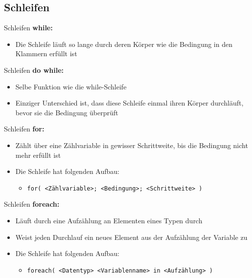 \subsection{Schleifen}
\begin{frame}{Schleifen}
	\textbf{while:} \\
	\begin{itemize}
		\item Die Schleife läuft so lange durch deren Körper wie die Bedingung in den Klammern erfüllt ist
	\end{itemize}
		
\end{frame}

\begin{frame}{Schleifen}
	\textbf{do while:} \\
	\begin{itemize}
		\item Selbe Funktion wie die while-Schleife
		\item Einziger Unterschied ist, dass diese Schleife einmal ihren Körper durchläuft, bevor sie die Bedingung überprüft
	\end{itemize}
		
\end{frame}

\begin{frame}{Schleifen}
	\textbf{for:} \\
	\begin{itemize}
		\item Zählt über eine Zählvariable in gewisser Schrittweite, bis die Bedingung nicht mehr erfüllt ist
		\item Die Schleife hat folgenden Aufbau:
		\begin{itemize}
			\item \alert{\texttt{for( <Zählvariable>; <Bedingung>; <Schrittweite> )}}
		\end{itemize}
	\end{itemize}
		
\end{frame}

\begin{frame}{Schleifen}
	\textbf{foreach:} \\
	\begin{itemize}
		\item Läuft durch eine Aufzählung an Elementen eines Typen durch 
		\item Weist jeden Durchlauf ein neues Element aus der Aufzählung der Variable zu 
		\item Die Schleife hat folgenden Aufbau:
		\begin{itemize}
			\item \alert{\texttt{foreach( <Datentyp> <Variablenname> in <Aufzählung> )}}
		\end{itemize}
	\end{itemize}
		
\end{frame}


